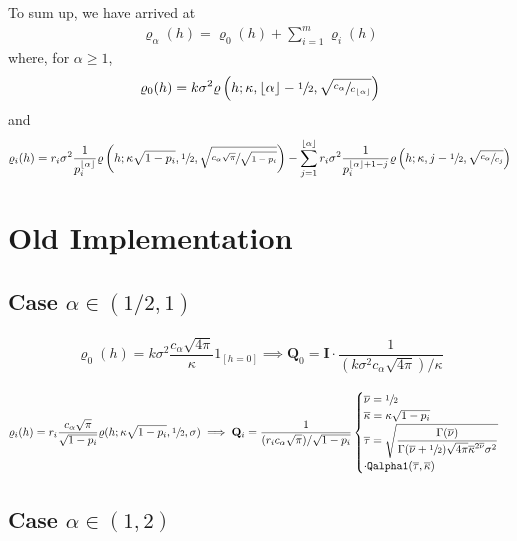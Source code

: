 \documentclass[11pt,a4paper]{article}
\theoremstyle{plain}
\theoremstyle{definition}
\begin{document}
To sum up, we have arrived at
\begin{align}
   \varrho_\alpha(h) = \varrho_0(h) + \sum_{i=1}^m  \varrho_i(h)
\end{align}
where, for $\alpha\geq1$,
\begin{align}
   \varrho_0(h) =  k\sigma^2\varrho\left(h;\kappa, \lfloor\alpha\rfloor-\sfrac{1}{2}, \sqrt{\sfrac{c_\alpha}{c_{\lfloor\alpha\rfloor}}}\right)
\end{align}
and 
\begin{align}
    \varrho_i(h) = r_i\sigma^2\dfrac{1}{p_i^{\lfloor\alpha\rfloor}} \varrho\left(h;\kappa\sqrt{1-p_i}, \sfrac{1}{2}, \sqrt{\sfrac{c_\alpha\sqrt{\pi}}{\sqrt{1-p_i}}}\right) -  \sum_{j=1}^{\lfloor\alpha\rfloor} r_i\sigma^2\dfrac{1}{p_i^{\lfloor\alpha\rfloor+1-j}}\varrho\left(h;\kappa, j-\sfrac{1}{2}, \sqrt{\sfrac{c_\alpha}{c_j}}\right)
\end{align}

\section{Old Implementation}

\subsection{Case $\alpha\in(1/2,1)$}

\begin{align}
    \varrho_0(h) = k\sigma^2\dfrac{c_\alpha\sqrt{4\pi}}{\kappa}1_{[h=0]}\implies \mathbf{Q}_0 = \mathbf{I}\cdot \dfrac{1}{(k\sigma^2c_\alpha\sqrt{4\pi})/\kappa}
\end{align}

\begin{align}
    \varrho_i(h) = r_i \dfrac{c_\alpha\sqrt{\pi}}{\sqrt{1-p_i}}\varrho(h;\kappa\sqrt{1-p_i}, \sfrac{1}{2}, \sigma) \implies \mathbf{Q}_i = \dfrac{1}{(r_i c_\alpha\sqrt{\pi})/\sqrt{1-p_i}}\begin{cases}
        \overline{\nu} = \sfrac{1}{2}\\
        \overline{\kappa} = \kappa\sqrt{1-p_i}\\
        \overline{\tau} =  \sqrt{\dfrac{\Gamma(\overline{\nu})}{\Gamma(\overline{\nu}+\sfrac{1}{2})\sqrt{4\pi}\overline{\kappa}^{2\overline{\nu}}\sigma^2}}\\
        \cdot\texttt{Qalpha1}(\overline{\tau}, \overline{\kappa})
    \end{cases}
\end{align}
\subsection{Case $\alpha\in(1,2)$}
\end{document}
